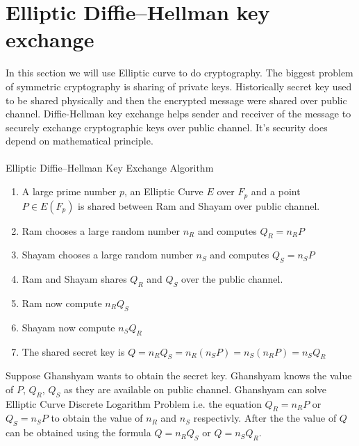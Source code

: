 \documentclass[a4paper,12pt]{report}
\begin{document}
\section{Elliptic Diﬃe–Hellman key exchange}
In this section we will use Elliptic curve to do cryptography. The biggest problem of symmetric cryptography is sharing of private keys. Historically secret key used to be shared physically and then the encrypted message were shared over public channel. Diffie-Hellman key exchange helps sender and receiver of the message to securely exchange cryptographic keys over public channel. It's security does depend on mathematical principle. \\\\
Elliptic Diﬃe–Hellman Key Exchange Algorithm
\begin{enumerate}
	\item A large prime number $p$, an Elliptic Curve $E$ over $F_p$ and a point $P \in E(F_p)$  is shared between Ram and Shayam over public channel.
	\item Ram chooses a large random number $n_R$ and computes $Q_R = n_R P$
	\item Shayam chooses a large random number $n_S$ and computes $Q_S = n_S P$
	\item Ram and Shayam shares $Q_R$ and $Q_S$ over the public channel.
	\item Ram now compute $n_R Q_S$
	\item Shayam now compute $n_S Q_R$
	\item The shared secret key is $Q=n_R Q_S=n_R (n_S P)=n_S (n_R P)=n_S Q_R$
\end{enumerate}
Suppose Ghanshyam wants to obtain the secret key. Ghanshyam knows the value of $P$, $Q_R$, $Q_S$ as they are available on public channel. Ghanshyam can solve Elliptic Curve Discrete Logarithm Problem i.e. the equation $Q_R = n_R P$ or $Q_S = n_S P$ to obtain the value of $n_R$ and $n_S$ respectivly. After the the value of $Q$ can be obtained using the formula $Q=n_R Q_S$ or $Q=n_S Q_R$. 


\end{document}
